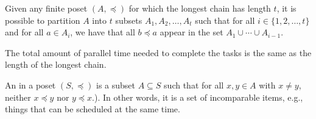 \documentclass[12pt]{article}
\begin{document}
\begin{theorem}\label{thm:decompose}
Given any finite poset $(A, \preceq)$ for which the longest chain has length $t$, it is possible to partition $A$ into $t$ subsets $A_1, A_2, \ldots, A_t$ such that for all $i \in \{1, 2, \ldots, t\}$ and for all $a \in A_i$, we have that all $b \preceq a$ appear in the set $A_1 \cup \cdots \cup A_{i-1}$. 
\end{theorem}
\begin{corollary}
The total amount of parallel time needed to complete the tasks is the same as the length of the longest chain. 
\end{corollary}
%
%
\begin{definition}
An  in a poset $(S, \preceq)$ is a subset $A \subseteq S$ such that for all $x, y \in A$ with $x\ne y$, neither $x \preceq y$ nor $y \preceq x$.). In other words, it is a set of incomparable items, e.g., things that can be scheduled at the same time. 
\end{definition}
\end{document}
